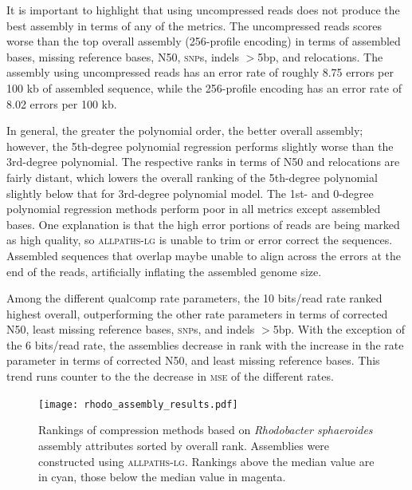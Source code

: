 \documentclass[12pt,\mydriver]{thesis}
\begin{document}
It is important to highlight that using uncompressed reads does not
produce the best assembly in terms of any of the metrics. The
uncompressed reads scores worse than the top overall assembly
(256-profile encoding) in terms of assembled bases, missing reference
bases, N50, \textsc{snp}s, indels $>$5bp, and relocations. The
assembly using uncompressed reads has an error rate of roughly 8.75
errors per 100 kb of assembled sequence, while the 256-profile
encoding has an error rate of 8.02 errors per 100 kb.

In general, the greater the polynomial order, the better overall
assembly; however, the 5th-degree polynomial regression performs
slightly worse than the 3rd-degree polynomial. The respective ranks in
terms of N50 and relocations are fairly distant, which lowers the
overall ranking of the 5th-degree polynomial slightly below that for
3rd-degree polynomial model. The 1st- and 0-degree polynomial
regression methods perform poor in all metrics except assembled bases.
One explanation is that the high error portions of reads are being
marked as high quality, so \textsc{allpaths-lg} is unable to trim or
error correct the sequences. Assembled sequences that overlap maybe
unable to align across the errors at the end of the reads, artificially
inflating the assembled genome size.

Among the different \textsc{q}ual\textsc{c}omp rate parameters, the 10 bits/read rate
ranked highest overall, outperforming the other rate parameters in
terms of corrected N50, least missing reference bases, \textsc{snp}s,
and indels $>$5bp. With the exception of the 6 bits/read rate, the
assemblies decrease in rank with the increase in the rate parameter in
terms of corrected N50, and least missing reference bases. This trend
runs counter to the the decrease in \textsc{mse} of the different
rates.


\begin{figure}[!htb]\begin{center}
\texttt{[image: rhodo\_assembly\_results.pdf]}
\end{center}
\renewcommand{\baselinestretch}{1}
\small\normalsize
\begin{quote}
\caption[Rankings of compression methods based on \textit{Rhodobacter
    sphaeroides} assembly attributes]{Rankings of compression methods based on \textit{Rhodobacter
    sphaeroides} assembly attributes sorted by overall
  rank. Assemblies were constructed using \textsc{allpaths-lg}.
  Rankings above the median value are in cyan, those below the median
  value in magenta.}
  \label{fig:assembly_ranks}
\end{quote}
\end{figure}
\renewcommand{\baselinestretch}{2}
\small\normalsize
\end{document}
